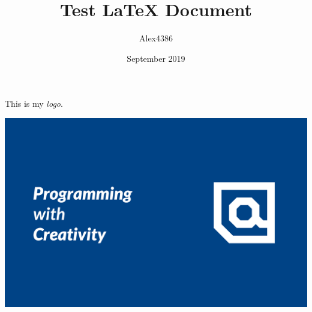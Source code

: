 \documentclass[12pt, letterpaper]{article}
\title{Test LaTeX Document}
\author{Alex4386}
\date{September 2019}
\begin{document}
\maketitle

This is my \emph{logo}.

\includegraphics[width=\linewidth]{background.png}
\end{document}
